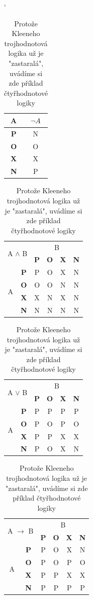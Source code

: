 \documentclass[11pt,a4paper,titlepage]{article}
\begin{document}
\begin{table}[ht]
\catcode`
\begin{center}
\begin{tabular}{|c|c|}
\hline
A & $\lnot A$ \\ \hline
\bfseries P & N \\ \hline
\bfseries O & O\\ \hline
\bfseries X & X \\ \hline 
\bfseries N & P \\ \hline
\end{tabular}
\begin{tabular}{|c|c|c|c|c|c|}
\hline
\multicolumn{2}{|c}{\multirow{2}{*}{A $\wedge$ B}}  & \multicolumn{4}{|c|}{ B}\\ \cline{3-6}
\multicolumn{2}{|c|}{} & \textbf P & \textbf O & \textbf X & \textbf N \\ \hline
\multirow{4}{*}{A} & \textbf P & P & O & X & N\\ \cline{2-6}
 & \textbf O & O & O & N & N \\ \cline{2-6}
 & \textbf X & X & N & X & N \\ \cline{2-6}
 & \textbf N & N & N & N & N \\ \hline
\end{tabular}
\begin{tabular}{|c|c|c|c|c|c|}
\hline
\multicolumn{2}{|c}{\multirow{2}{*}{A $\vee$ B}}  & \multicolumn{4}{|c|}{ B}\\ \cline{3-6}
\multicolumn{2}{|c|}{} & \textbf P & \textbf O & \textbf X & \textbf N \\ \hline
\multirow{4}{*}{A} & \textbf P & P & P & P & P\\ \cline{2-6}
 & \textbf O & P & O & P & O \\ \cline{2-6}
 & \textbf X & P & P & X & X \\ \cline{2-6}
 & \textbf N & P & O & X & N \\ \hline
\end{tabular}
\begin{tabular}{|c|c|c|c|c|c|}
\hline
\multicolumn{2}{|c}{\multirow{2}{*}{A $\rightarrow$ B}}  & \multicolumn{4}{|c|}{ B}\\ \cline{3-6}
\multicolumn{2}{|c|}{} & \textbf P & \textbf O & \textbf X & \textbf N \\ \hline
\multirow{4}{*}{A} & \textbf P & P & O & X & N\\ \cline{2-6}
 & \textbf O & P & O & P & O \\ \cline{2-6}
 & \textbf X & P & P & X & X \\ \cline{2-6}
 & \textbf N & P & P & P & P \\ \hline
\end{tabular}
\caption{Protože Kleeneho trojhodnotová logika už je "zastaralá", uvádíme si zde příklad čtyřhodnotové logiky}
\label{tab:tab2}
\end{center}
\end{table}
\end{document}
